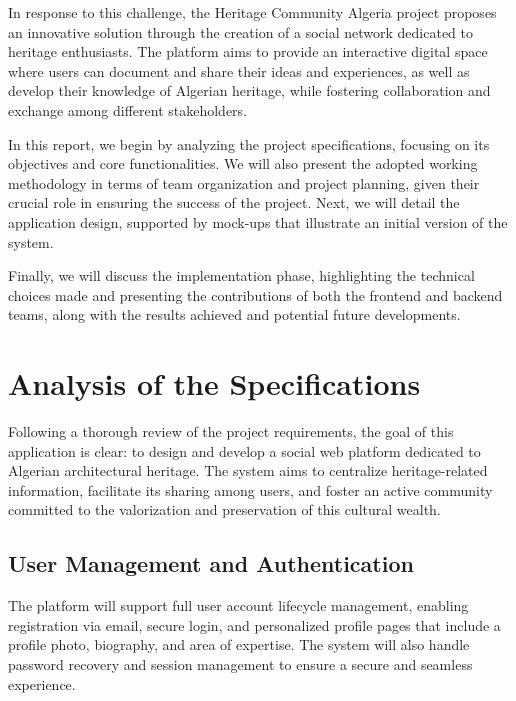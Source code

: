 \documentclass[12pt]{article}
\begin{document}
\vspace{0.5cm}

In response to this challenge, the Heritage Community Algeria project proposes an innovative solution through the creation of a social network dedicated to heritage enthusiasts. The platform aims to provide an interactive digital space where users can document and share their ideas and experiences, as well as develop their knowledge of Algerian heritage, while fostering collaboration and exchange among different stakeholders.

\vspace{0.5cm}

In this report, we begin by analyzing the project specifications, focusing on its objectives and core functionalities. We will also present the adopted working methodology in terms of team organization and project planning, given their crucial role in ensuring the success of the project. Next, we will detail the application design, supported by mock-ups that illustrate an initial version of the system.

\vspace{0.5cm}

Finally, we will discuss the implementation phase, highlighting the technical choices made and presenting the contributions of both the frontend and backend teams, along with the results achieved and potential future developments.

\newpage
\section{Analysis of the Specifications}

\vspace{0.5cm}

Following a thorough review of the project requirements, the goal of this application is clear: to design and develop a social web platform dedicated to Algerian architectural heritage. The system aims to centralize heritage-related information, facilitate its sharing among users, and foster an active community committed to the valorization and preservation of this cultural wealth.

\subsection{User Management and Authentication}
The platform will support full user account lifecycle management, enabling registration via email, secure login, and personalized profile pages that include a profile photo, biography, and area of expertise. The system will also handle password recovery and session management to ensure a secure and seamless experience.
\end{document}
